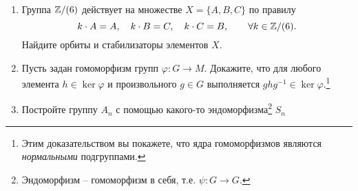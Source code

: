 \begin{enumerate}
     \item Группа $\mathbb Z / (6)$ действует на множестве $X = \{A, B, C\}$ по правилу
          $$k \cdot A = A, \quad k \cdot B = C, \quad k \cdot C = B, \qquad \forall k \in \mathbb Z / (6).$$
          Найдите орбиты и стабилизаторы элементов $X$.
     \item Пусть задан гомоморфизм групп $\varphi \colon G \to M$. 
        Докажите, что для любого элемента $h \in \ker \varphi$ и произвольного $g \in G$
        выполняется $ghg^{-1} \in \ker \varphi$.\footnote{
        Этим доказательством вы покажете, что ядра гомоморфизмов являются \emph{нормальными} подгруппами.}
    \item Постройте группу $A_n$ с помощью какого-то эндоморфизма\footnote{
        Эндоморфизм -- гомоморфизм в себя, т.е. $\psi \colon G \to G$.} $S_n$
\end{enumerate}
